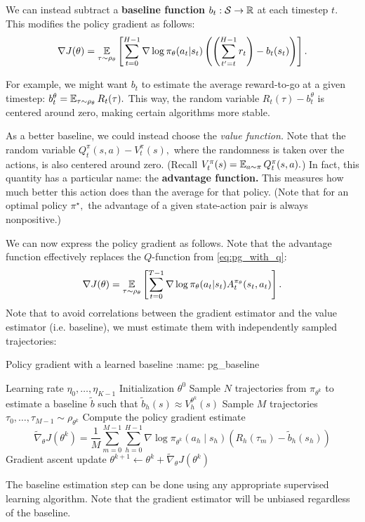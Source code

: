 \documentclass[\main/main]{subfiles}
\begin{document}
We can instead subtract a \textbf{baseline function} $b_t : \mathcal{S} \to \mathbb{R}$ at each timestep $t.$ This modifies the policy gradient as follows: \begin{equation}
    \nabla J(\theta) = \operatorname*{\mathbb{E}}_{\tau \sim \rho_\theta} \left[
        \sum_{t=0}^{H-1} \nabla \log \pi_\theta (a_t | s_t) \left(
        \left(
        \sum_{t' = t}^{H-1} r_t
        \right)
        - b_t(s_t)
        \right)
        \right].
    \label{eq:pg_baseline}
\end{equation}


For example, we might want $b_t$ to estimate the average reward-to-go at a given timestep: $b_t^\theta = \operatorname*{\mathbb{E}}_{\tau \sim \rho_\theta} R_t(\tau).$ This way,
the random variable $R_t(\tau) - b_t^\theta$ is centered around zero,
making certain algorithms more stable.

As a better baseline, we could instead choose the \emph{value function.} Note that the random variable $Q^\pi_t(s, a) - V^\pi_t(s),$ where the randomness is taken over the actions,
is also centered around zero. (Recall $V^\pi_t(s) = \operatorname*{\mathbb{E}}_{a \sim \pi} Q^\pi_t(s, a).$) In fact, this quantity has a particular name: the \textbf{advantage function.}
This measures how much better this action does than the average for that policy.
(Note that for an optimal policy $\pi^\star,$ the advantage of a given state-action pair is always nonpositive.)

We can now express the policy gradient as follows. Note that the advantage function effectively replaces the $Q$-function from \autoref{eq:pg_with_q}: \begin{equation}
    \nabla J(\theta) = \operatorname*{\mathbb{E}}_{\tau \sim \rho_\theta} \left[
        \sum_{t=0}^{T-1} \nabla \log \pi_\theta(a_t | s_t) A^{\pi_\theta}_t (s_t, a_t)
        \right].
    \label{eq:pg_advantage}
\end{equation}
Note that to avoid correlations between the gradient estimator and the value estimator (i.e. baseline), we must estimate them with independently sampled trajectories:
\begin{definition}{Policy gradient with a learned baseline}
:name: pg_baseline

    \begin{algorithmic}
        \Require Learning rate $\eta_0, \dots, \eta_{K-1}$
        \Require Initialization $\theta^0$
        \State Sample $N$ trajectories from $\pi_{\theta^k}$ to estimate a baseline $\tilde b$ such that $\tilde b_h(s) \approx V_h^{\theta^k}(s)$
        \State Sample $M$ trajectories $\tau_0, \dots, \tau_{M-1} \sim \rho_{\theta^k}$
        \State Compute the policy gradient estimate \[
            \tilde{\nabla}_\theta J(\theta^k) = \frac{1}{M} \sum_{m=0}^{M-1} \sum_{h=0}^{H-1} \nabla \log \pi_{\theta^k} (a_h \mid s_h) (R_h(\tau_m) - \tilde b_h(s_h))
        \]
        \State Gradient ascent update $\theta^{k+1} \gets \theta^k + \tilde \nabla_\theta J(\theta^k)$
        \EndFor
    \end{algorithmic}

    The baseline estimation step can be done using any appropriate supervised learning algorithm. Note that the gradient estimator will be unbiased regardless of the baseline.
\end{definition}
\end{document}
